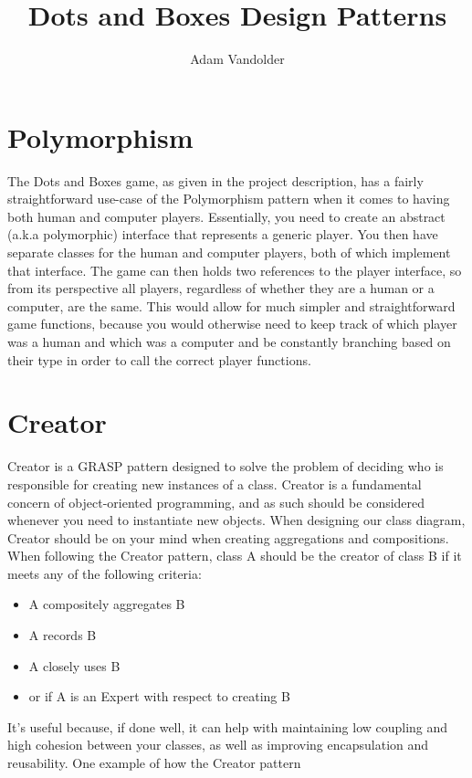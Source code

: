 \documentclass{article}
\title{Dots and Boxes Design Patterns}
\author{Adam Vandolder}
\begin{document}
    \maketitle
    \section{Polymorphism}
    The Dots and Boxes game, as given in the project description, has a fairly
    straightforward use-case of the Polymorphism pattern when it comes to having
    both human and computer players. Essentially, you need to create an abstract
    (a.k.a polymorphic) interface that represents a generic player. You then
    have separate classes for the human and computer players, both of which
    implement that interface. The game can then holds two references to the
    player interface, so from its perspective all players, regardless of whether
    they are a human or a computer, are the same. This would allow for much 
    simpler and straightforward game functions, because you would otherwise need
    to keep track of which player was a human and which was a computer and be
    constantly branching based on their type in order to call the correct player
    functions.
    \newpage
    \section{Creator}
    Creator is a GRASP pattern designed to solve the problem of deciding who is 
    responsible for creating new instances of a class. Creator is a fundamental
    concern of object-oriented programming, and as such should be considered
    whenever you need to instantiate new objects. When designing our class
    diagram, Creator should be on your mind when creating aggregations and
    compositions. When following the Creator pattern, class A should be the
    creator of class B if it meets any of the following criteria:
    \begin{itemize}
        \item A compositely aggregates B
        \item A records B
        \item A closely uses B
        \item or if A is an Expert with respect to creating B
    \end{itemize}
    It's useful because, if done well, it can help with maintaining low coupling
    and high cohesion between your classes, as well as improving encapsulation
    and reusability. One example of how the Creator pattern
\end{document}
